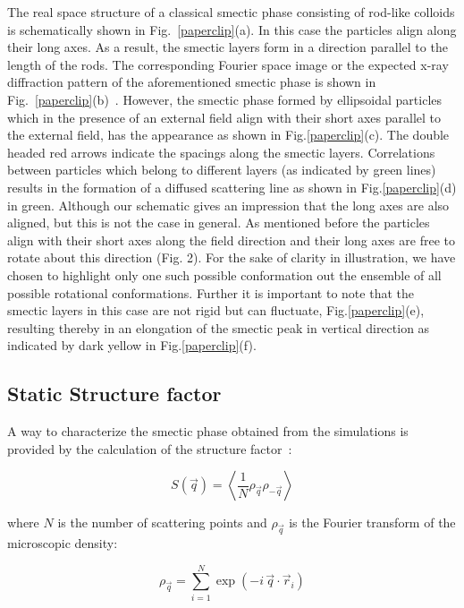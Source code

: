 \documentclass[aip,graphicx]{revtex4-1} %
\begin{document}
The real space structure of a classical smectic phase consisting of rod-like colloids is schematically shown in Fig.~\ref{paperclip}(a). In this case the
particles align along their long  axes. As a result, the smectic layers form in a direction parallel to the length of the rods. The corresponding Fourier space
image or the expected x-ray diffraction pattern of the aforementioned smectic phase is shown in Fig.~\ref{paperclip}(b)~\cite{kuijk2012phase, byelov2013situ}.
However, the smectic phase formed by ellipsoidal particles which in the presence of an external field align with their short axes parallel to the external
field, has the appearance as shown in Fig.\ref{paperclip}(c). The double headed red arrows indicate the spacings along the smectic layers. Correlations between
particles which belong to different layers (as indicated by green lines) results in the formation of a diffused scattering line as shown in
Fig.\ref{paperclip}(d) in green. Although our schematic gives an impression that the long axes are also aligned, but this is not the case in general. As
mentioned before the particles align with their short axes along the field direction and their long axes are free to rotate about this direction (Fig. 2). For
the sake of clarity in illustration, we have chosen to
highlight only one such possible conformation out the ensemble of all possible rotational conformations. Further it is important to note that the smectic layers
in this case are not rigid but can fluctuate, Fig.\ref{paperclip}(e), resulting thereby in an elongation of the smectic peak in vertical direction as indicated
by dark yellow in Fig.\ref{paperclip}(f).


\subsection{Static Structure factor}

A way to characterize the smectic phase obtained from the simulations is provided by the calculation of the structure factor~\cite{Hansen_McDonald}:

\begin{equation}\label{eq:S_q}
    S( \vec{q} ) = \left\langle \frac{1}{N} \rho_{\vec{q}} \rho_{-\vec{q}} \right\rangle 
\end{equation}

where $N$ is the number of scattering points and $\rho_{\vec{q}}$ is the Fourier transform of the microscopic density:

\begin{equation}
    \rho_{\vec{q}} = \sum_{i=1}^N \exp(-i\, \vec{q} \cdot \vec{r}_i)
\end{equation}
\end{document}
